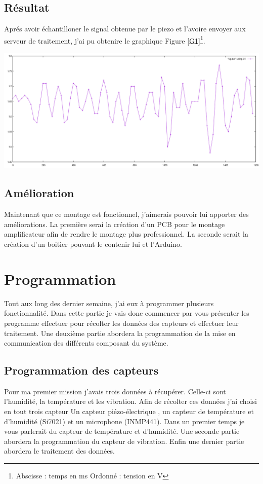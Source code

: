 \documentclass[11pt,french,a4paper]{article}
\begin{document}
\subsection{Résultat}
Aprés avoir échantilloner le signal obtenue par le piezo et l'avoire envoyer aux serveur de traitement, j'ai pu obtenire le graphique Figure \ref{G1}\footnote{ Abscisse : temps en ms Ordonné : tension en V }.
\begin{center}
    \includegraphics[scale=0.3]{../img/GRAPH1.png}
    \label{G1}
\end{center}
\subsection{Amélioration}
Maintenant que ce montage est fonctionnel, j'aimerais pouvoir lui apporter des améliorations. La première serai la création d'un PCB pour le montage amplificateur afin de rendre le montage plus professionnel. La seconde serait la création d'un boitier pouvant le contenir lui et l'Arduino. 
\newpage
\section{Programmation}
Tout aux long des dernier semaine, j'ai eux à programmer plusieurs fonctionnalité. Dans cette partie je vais donc commencer par vous présenter les programme effectuer pour récolter les données des capteurs et effectuer leur traitement. Une deuxième partie abordera la programmation de la mise en communication des différents composant du système.
\subsection{Programmation des capteurs}
Pour ma premier mission j'avais trois  données à récupérer. Celle-ci sont l'humidité, la température et les vibration. Afin de récolter ces données j'ai choisi en tout trois capteur Un capteur piézo-électrique , un capteur de température et d'humidité (Si7021) et un microphone (INMP441). Dans un premier temps je vous parlerait du capteur de température et d'humidité. Une seconde partie abordera la programmation du capteur de vibration. Enfin une dernier partie abordera le traitement des données.  
\end{document}
